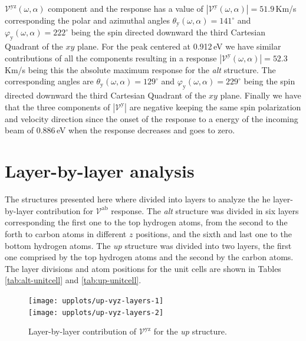 \documentclass[prb,11pt,tightenlines,twocolumn,aps]{revtex4-1}
\begin{document}
$\mathcal{V}^{\mathrm{yz}}(\omega,\alpha)$ component and the response has a
value of $|\mathcal{V}^{\mathrm{y}}(\omega,\alpha)| = 51.9$\,Km/s corresponding
the polar and azimuthal angles $\theta_{\mathrm{y}}(\omega,\alpha) =
141^{\circ}$ and $\varphi_{\mathrm{y}}(\omega,\alpha) = 222^{\circ}$ being the
spin directed downward the third Cartesian Quadrant of the $xy$ plane.
% 
For the peak centered at 0.912\,eV we have similar contributions of all the
components resulting in a response $|\mathcal{V}^{\mathrm{y}}(\omega,\alpha)| =
52.3$\,Km/s being this the absolute maximum response for the \emph{alt}
structure. The corresponding angles are $\theta_{\mathrm{y}}(\omega,\alpha) =
129^{\circ}$ and $\varphi_{\mathrm{y}}(\omega,\alpha) = 229^{\circ}$ being the
spin directed downward the third Cartesian Quadrant of the $xy$ plane.
% 
Finally we have that the three components of $|\mathcal{V}^{\mathrm{y}}|$ are
negative keeping the same spin polarization and velocity direction since the
onset of the response to a energy of the incoming beam of 0.886\,eV when the
response decreases and goes to zero.


\section{Layer-by-layer analysis} %
\label{sec:res-layer_by_layer_analysis}

The structures presented here where divided into layers to analyze the he
layer-by-layer contribution for $\mathcal{V}^{\mathrm{ab}}$ response. The
\emph{alt} structure was divided in six layers corresponding the first one to
the top hydrogen atoms, from the second to the forth to carbon atoms in
different $z$ positions, and the sixth and last one to the bottom hydrogen
atoms. The \emph{up} structure was divided into two layers, the first one
comprised by the top hydrogen atoms and the second by the carbon atoms. The
layer divisions and atom positions for the unit cells are shown in Tables
\ref{tab:alt-unitcell} and \ref{tab:up-unitcell}.

\begin{figure}[t]
    \centering
    \texttt{[image: upplots/up-vyz-layers-1]}
    \label{fig:up-vyz-lay-1}
    \\
    \texttt{[image: upplots/up-vyz-layers-2]}
    \label{fig:up-vyz-lay-2}
    
    \caption{Layer-by-layer contribution of $\mathcal{V}^{\mathrm{yz}}$ for the
     \emph{up} structure.}
    \label{fig:up-vyz-lay}
\end{figure}
\end{document}
